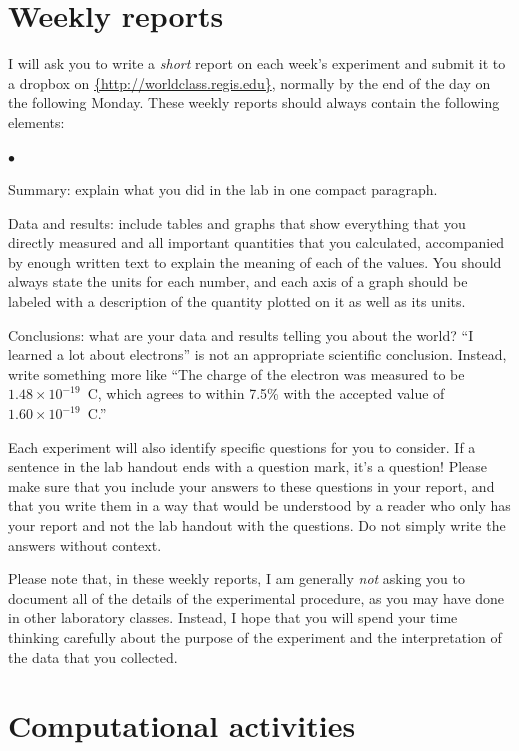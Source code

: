 \documentclass[11pt]{article}
\newcommand{\squishlist}{
   \begin{list}{$\bullet$}
    { \setlength{\itemsep}{0pt}      \setlength{\parsep}{3pt}
      \setlength{\topsep}{3pt}       \setlength{\partopsep}{0pt}
      \setlength{\leftmargin}{1.5em} \setlength{\labelwidth}{1em}
      \setlength{\labelsep}{0.5em} } }
\newcommand{\squishend}{
    \end{list}  }
\begin{document}
\section{Weekly reports}

I will ask you to write a {\em short} report on each week's experiment and 
submit it to a dropbox on \url{{http://worldclass.regis.edu}},
normally by the end of the day on the following Monday.
These weekly reports should always contain the following elements:
\squishlist
\item Summary: explain what you did in the lab in one compact paragraph.
\item Data and results: include tables and graphs that show everything 
  that you directly measured and all important quantities that you calculated,
  accompanied by enough written text to explain the meaning of each of the 
  values.  You should always state the units for each number, and each axis 
  of a graph should be labeled with a description of the quantity plotted on 
  it as well as its units.
\item Conclusions: what are your data and results telling you about the world?
  ``I learned a lot about electrons'' is not an appropriate scientific conclusion.  
  Instead, write something more like ``The charge of the electron was measured to be $1.48 \times 10^{-19}$~C, which agrees to within 7.5\% with the accepted value of $1.60 \times 10^{-19}$~C.''
\squishend

Each experiment will also identify specific questions for you to consider.  
If a sentence in the lab handout ends with a question mark, it's a question!
Please make sure that you include your answers to these questions in your 
report, and that you write them in a way that would be understood by a reader 
who only has your report and not the lab handout with the questions.
Do not simply write the answers without context.

Please note that, in these weekly reports, I am generally {\em not} asking you 
to document all of the details of the experimental procedure, as you may
have done in other laboratory classes.  Instead, I hope that you will spend 
your time thinking carefully about the purpose of the experiment and the 
interpretation of the data that you collected.

\section{Computational activities}
\end{document}

